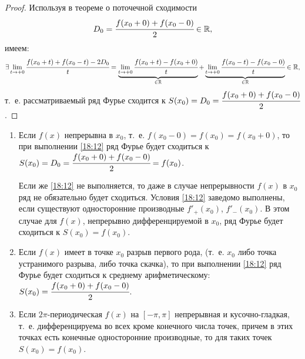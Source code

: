 \documentclass[../../main.tex]{subfiles}
\begin{document}
	
		\begin{proof}
		Используя в теореме о поточечной сходимости
		 \[D_0=\cfrac{f(x_0+0)+f(x_0-0)}{2}\in\mathbb{R},\] имеем:
		\[
		\exists\lim_{t\rightarrow+0}\cfrac{f(x_0+t)+f(x_0-t)-2D_0}{t}=
		\underbrace{\lim_{t\rightarrow+0}\cfrac{f(x_0+t)-f(x_0+0)}{t}}_{\in\mathbb{R}}
		+\underbrace{\lim_{t\rightarrow+0}\cfrac{f(x_0-t)-f(x_0-0)}{t}}_{\in\mathbb{R}}
		\in\mathbb{R},\]
		т.~е. рассматриваемый ряд Фурье сходится к 
		$S(x_0)=D_0=\cfrac{f(x_0+0)+f(x_0-0)}{2}$.
	\end{proof}	
	
	\begin{rems}
		\;
		
		\begin{enumerate}
			\item Если $f(x)$ непрерывна в $x_0$, т.~е.
			 $f(x_0-0)=f(x_0)=f(x_0+0)$, то при выполнении \eqref{18:12}
			ряд Фурье будет сходиться к $S(x_0)=D_0=\cfrac{f(x_0+0)+f(x_0-0)}{2} = 
			f(x_0)$.
			
			Если же \eqref{18:12} не выполняется, то даже в случае
			непрерывности $f(x)$ в $x_0$ ряд не обязательно будет сходиться.
			Условия \eqref{18:12} заведомо выполнены, если существуют 
			односторонние производные $f'_+(x_0)$, $f'_-(x_0)$. В этом случае для 
			$f(x)$, непрерывно дифференцируемой в $x_0$, ряд Фурье будет 
			сходиться к $S(x_0)=f(x_0)$.
			
			\item Если $f(x)$ имеет в точке $x_0$ разрыв первого рода, 
			(т.~е. $x_0$ либо точка устранимого разрыва, либо точка скачка),
			то при выполнении 
			\eqref{18:12} ряд Фурье будет сходиться к среднему 
			арифметическому: $S(x_0) = \cfrac{f(x_0+0)+f(x_0-0)}{2}$.
			
			\item Если $2\pi$-периодическая $f(x)$ на 
			$\left[-\pi,\pi \right]$ непрерывная и кусочно-гладкая, т.~е.
			дифференцируема во всех кроме конечного числа точек, причем
			в этих точках есть конечные односторонние производные, то для 
			таких точек $S(x_0)=f(x_0)$. 
		\end{enumerate}
	\end{rems}
\end{document}
